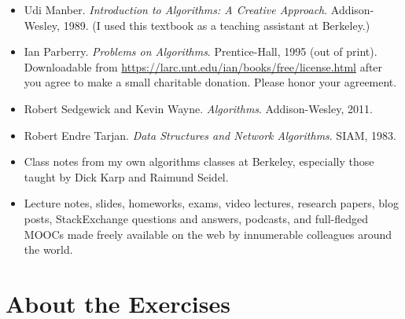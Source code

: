 \begin{itemize}
\item Udi Manber. \textit{Introduction to Algorithms: A Creative Approach}. Addison-Wesley, 1989. (I used this textbook as a teaching assistant at Berkeley.)
\item Ian Parberry. \textit{Problems on Algorithms}. Prentice-Hall, 1995 (out of print). Downloadable from {\url{https://larc.unt.edu/ian/books/free/license.html}} after you agree to make a small charitable donation. Please honor your agreement.
\item Robert Sedgewick and Kevin Wayne. \textit{Algorithms}. Addison-Wesley, 2011.
\item Robert Endre Tarjan. \textit{Data Structures and Network Algorithms}. SIAM, 1983.
\item Class notes from my own algorithms classes at Berkeley, especially those taught by Dick Karp and Raimund Seidel.
\item Lecture notes, slides, homeworks, exams, video lectures, research papers, blog posts, StackExchange questions and answers, podcasts, and full-fledged MOOCs made freely available on the web by innumerable colleagues around the world.
\end{itemize}

\section*{About the Exercises}

